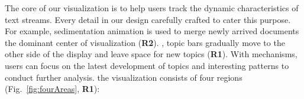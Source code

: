 The core  of our visualization is to help users track the dynamic characteristics of text streams.
Every detail in our design  carefully crafted to cater  this purpose.
For example, sedimentation animation is used to merge newly arrived documents  the dominant center of  visualization (\textbf{\normalsize R2}).
, topic bars gradually move to the other side of the display and leave  space for new topics (\textbf{\normalsize R1}).
With  mechanisms, users can focus on the latest development of topics and  interesting patterns to conduct further analysis.
 the visualization consists of four regions (Fig.~\ref{fig:fourAreas}, \textbf{\normalsize R1}):
